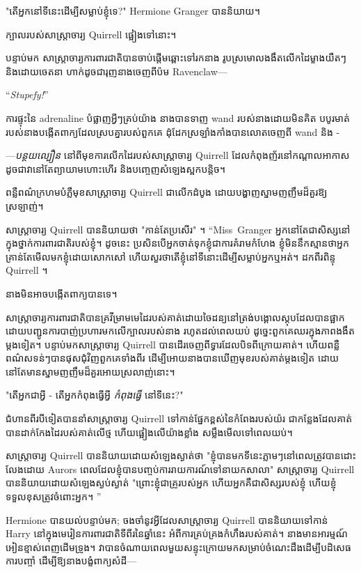 {{"តើអ្នកនៅទីនេះដើម្បីសម្លាប់ខ្ញុំទេ?" Hermione Granger បាននិយាយ។

ក្បាលរបស់សាស្រ្តាចារ្យ Quirrell ផ្អៀងទៅនោះ។

បន្ទាប់មក សាស្ត្រាចារ្យការពារជាតិបានចាប់ផ្តើមឆ្ពោះទៅរកនាង រូបស្រមោលងងឹតលើកដៃម្ខាងយឺតៗ និងដោយចេតនា ហាក់ដូចជារុញនាងចេញពីប៉ម Ravenclaw—

“\emph{Stupefy!}”

ការផ្ទុះនៃ adrenaline បំផ្លាញអ្វីៗគ្រប់យ៉ាង នាងបានទាញ wand របស់នាងដោយមិនគិត បបូរមាត់របស់នាងបង្កើតពាក្យដែលស្របគ្នារបស់ពួកគេ ដុំដែកស្រឡាំងកាំងបានលោតចេញពី wand និង -

—\emph{បន្ថយល្បឿន} នៅពីមុខការលើកដៃរបស់សាស្រ្តាចារ្យ Quirrell ដែលកំពុងញ័រនៅកណ្តាលអាកាស ដូចជាវានៅតែព្យាយាមហោះហើរ និងបញ្ចេញសំឡេងស្អកបន្តិច។

ពន្លឺ​ពណ៌​ក្រហម​បំភ្លឺ​មុខ​សាស្ត្រាចារ្យ Quirrell ជា​លើក​ដំបូង ដោយ​បង្ហាញ​ស្នាម​ញញឹម​ដ៏​គួរ​ឱ្យ​ស្រឡាញ់។

សាស្រ្តាចារ្យ Quirrell បាននិយាយថា "កាន់តែប្រសើរ" ។ “Miss~Granger អ្នកនៅតែជាសិស្សនៅក្នុងថ្នាក់ការពារជាតិរបស់ខ្ញុំ។ ដូចនេះ ប្រសិនបើអ្នកចាត់ទុកខ្ញុំជាការគំរាមកំហែង ខ្ញុំមិននឹកស្មានថាអ្នកគ្រាន់តែមើលមកខ្ញុំដោយសោកសៅ ហើយសួរថាតើខ្ញុំនៅទីនោះដើម្បីសម្លាប់អ្នកឬអត់។ ដកពីរពិន្ទុ Quirrell ។

នាងមិនអាចបង្កើតពាក្យបានទេ។

សាស្ត្រាចារ្យ​ការពារ​ជាតិ​បាន​គ្រវី​ម្រាម​មេ​ដៃ​របស់​គាត់​ដោយ​ចៃដន្យ​នៅ​ត្រង់​បង្គោល​ស្តុប​ដែល​បាន​ផ្អាក ដោយ​បញ្ជូន​ការ​បាញ់​ប្រហារ​មក​លើ​ក្បាល​របស់​នាង រហូត​ដល់​ពេល​យប់ ដូច្នេះ​ពួកគេ​ឈរ​ក្នុង​ភាព​ងងឹត​ម្ដង​ទៀត។ បន្ទាប់មកសាស្រ្តាចារ្យ Quirrell បានដើរចេញពីទ្វារដែលបិទពីក្រោយគាត់។ ហើយពន្លឺពណ៌សទន់ៗបានផុសជុំវិញពួកគេទាំងពីរ ដើម្បីអោយនាងបានឃើញមុខរបស់គាត់ម្តងទៀត ដោយនៅតែមានស្នាមញញឹមដ៏គួរអោយស្រលាញ់នោះ។

"តើអ្នកជាអ្វី - តើអ្នកកំពុងធ្វើអ្វី \emph{កំពុងធ្វើ} នៅទីនេះ?"

ជំហានពីរបីទៀតបាននាំសាស្ត្រាចារ្យ Quirrell ទៅកាន់ផ្នែកខ្ពស់នៃកំពែងរបស់យ៉រ ជាកន្លែងដែលគាត់បានដាក់កែងដៃរបស់គាត់លើថ្ម ហើយផ្អៀងលើយ៉ាងខ្លាំង សម្លឹងមើលទៅពេលយប់។

សាស្ត្រាចារ្យ Quirrell បាននិយាយដោយសំឡេងស្ងាត់ថា "ខ្ញុំបានមកទីនេះភ្លាមៗនៅពេលត្រូវបានដោះលែងដោយ Aurors ពេលដែលខ្ញុំបានបញ្ចប់ការរាយការណ៍ទៅនាយកសាលា" សាស្ត្រាចារ្យ Quirrell បាននិយាយដោយសំឡេងស្ងប់ស្ងាត់ "ព្រោះខ្ញុំជាគ្រូរបស់អ្នក ហើយអ្នកគឺជាសិស្សរបស់ខ្ញុំ ហើយខ្ញុំទទួលខុសត្រូវចំពោះអ្នក។ ”

Hermione បានយល់បន្ទាប់មក; ចងចាំនូវអ្វីដែលសាស្រ្តាចារ្យ Quirrell បាននិយាយទៅកាន់ Harry នៅក្នុងមេរៀនការពារជាតិទីពីរនៃឆ្នាំនេះ អំពីការគ្រប់គ្រងកំហឹងរបស់គាត់។ នាងមានអារម្មណ៍អៀនខ្មាស់ពេញដើមទ្រូង។ វាបានចំណាយពេលមួយសន្ទុះក្រោយមកសម្រាប់ចំណេះដឹងដើម្បីបដិសេធការបញ្ចាំ ដើម្បីឱ្យនាងបង្ខំពាក្យសំដី—

}}
